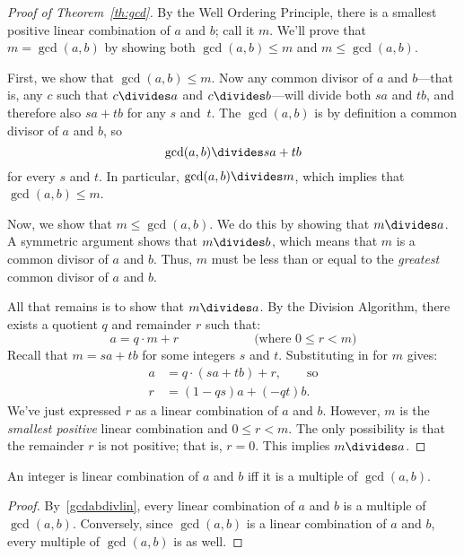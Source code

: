 \begin{proof}[Proof of Theorem~\ref{th:gcd}]
By the Well Ordering Principle, there is a smallest positive linear
combination of $a$ and $b$; call it $m$.  We'll prove that $m = \gcd(a,
b)$ by showing both $\gcd(a, b) \leq m$ and $m \leq \gcd(a, b)$.

First, we show that $\gcd(a, b) \leq m$.  Now any common divisor of
$a$ and $b$---that is, any $c$ such that $c \divides a$ and
$c \divides b$---will divide both $sa$ and $tb$, and therefore also
$sa+tb$ for any $s$ and~$t$.  The $\gcd(a, b)$ is by
definition a common divisor of $a$ and $b$, so
%
\begin{equation}\label{gcdabdivlin}
\gcd(a, b) \divides s a + t b
\end{equation}
for every $s$ and $t$.
%
In particular, $\gcd(a, b) \divides m$, which implies that $\gcd(a, b)
\leq m$.

Now, we show that $m \leq \gcd(a, b)$.  We do this by showing that $m
\divides a$.  A symmetric argument shows that $m \divides b$, which means
that $m$ is a common divisor of $a$ and $b$.  Thus, $m$ must be less than
or equal to the \emph{greatest} common divisor of $a$ and $b$.

All that remains is to show that $m \divides a$.  By the Division
Algorithm, there exists a quotient $q$ and remainder $r$ such that:
%
\[
a = q \cdot m + r \hspace{1in} \text{(where $0 \leq r < m$)}
\]
%
Recall that $m = s a + t b$ for some integers $s$ and $t$.
Substituting in for $m$ gives:
%
\begin{align*}
a & = q \cdot (s a + t b) + r, \qquad \text{so} \\
r & = (1 - qs) a + (-qt) b.
\end{align*}
%
We've just expressed $r$ as a linear combination of $a$ and $b$.
However, $m$ is the \emph{smallest positive} linear combination and
$0 \leq r < m$.  The only possibility is that the remainder $r$ is not
positive; that is, $r = 0$.  This implies $m \divides a$.
\end{proof}

\begin{corollary}\label{cor:lin-comb}
An integer is linear combination of $a$ and $b$ iff it is a multiple
of $\gcd(a, b)$.
\end{corollary}

\begin{proof}
By~\eqref{gcdabdivlin}, every linear combination of $a$ and $b$ is a
multiple of $\gcd(a, b)$.  Conversely, since $\gcd(a, b)$ is a linear
combination of $a$ and $b$, every multiple of $\gcd(a, b)$ is as well.
\end{proof}

